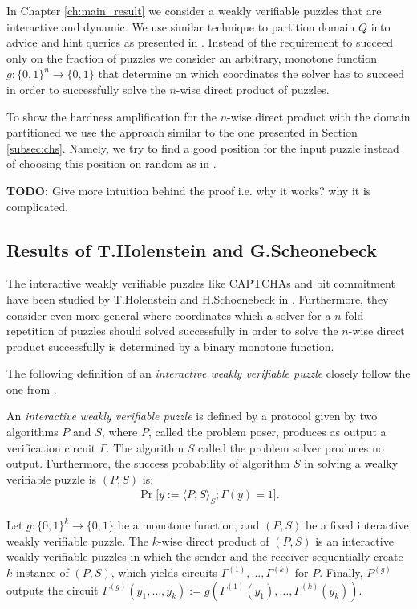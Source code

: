 In Chapter \ref{ch:main_result} we consider a weakly verifiable puzzles that are interactive and dynamic.
We use similar technique to partition domain $Q$ into advice and hint queries as presented in \cite{Dodis:2009:SAI:1530441.1530450}.
Instead of the requirement to succeed only on the fraction of puzzles we consider an arbitrary, monotone function $g : \{0,1\}^{n} \rightarrow \{0,1\}$
that determine on which coordinates the solver has to succeed in order to successfully solve the $n$-wise direct product of puzzles.

To show the hardness amplification for the $n$-wise direct product with the domain partitioned we use
the approach similar to the one presented in Section \ref{subsec:chs}. Namely, we try to find a good position for the input puzzle instead of
choosing this position on random as in \cite{Dodis:2009:SAI:1530441.1530450}.

\begin{todo}
  \textbf{TODO:} Give more intuition behind the proof i.e. why it works? why it is complicated.
\end{todo}

\subsection{Results of T.Holenstein and G.Scheonebeck}
The interactive weakly verifiable puzzles like CAPTCHAs and bit commitment have been studied
by T.Holenstein and H.Schoenebeck in \cite{DBLP:journals/corr/abs-1002-3534}.
Furthermore, they consider even more general where coordinates which a solver for
a $n$-fold repetition of puzzles should solved successfully in order to solve the $n$-wise direct product
successfully is determined by a binary monotone function.

The following definition of an \textit{interactive weakly verifiable puzzle} closely follow the one from \cite{DBLP:journals/corr/abs-1002-3534}.
\begin{definition}
An \textit{interactive weakly verifiable puzzle} is defined by a protocol given by two algorithms $P$ and $S$,
where $P$, called the problem poser, produces as output a verification circuit $\Gamma$. The algorithm $S$ called the problem solver
produces no output.
Furthermore, the \textnormal{success probability} of algorithm $S$ in solving a wealky verifiable puzzle is $(P,S)$ is:
\begin{align*}
  \Pr\Big[y := \langle P,S \rangle_{S}; \Gamma(y) = 1 \Big].
\end{align*}
\end{definition}
\begin{definition}
Let $g: \{0,1\}^{k} \rightarrow \{0,1\}$ be a monotone function, and $(P,S)$ be a fixed interactive weakly verifiable puzzle.
The $k$-wise direct product of $(P,S)$ is an interactive weakly verifiable puzzles in which the sender and the receiver
sequentially create $k$ instance of $(P,S)$, which yields circuits $\Gamma^{(1)}, \dotsc, \Gamma^{(k)}$ for $P$.
Finally, $P^{(g)}$ outputs the circuit $\Gamma^{(g)}(y_1, \dotsc, y_k) := g(\Gamma^{(1)}(y_1), \dotsc, \Gamma^{(k)}(y_k))$.
\end{definition}

